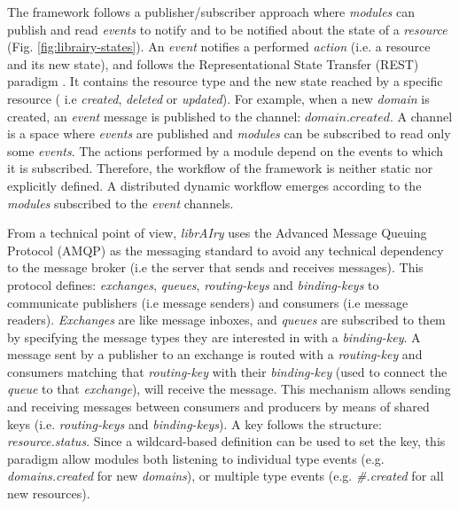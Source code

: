 

The framework follows a publisher/subscriber approach where \textit{modules} can publish and read \textit{events} to notify and to be notified about the state of a \textit{resource} (Fig. \ref{fig:librairy-states}). An \textit{event} notifies a performed \textit{action} (i.e. a resource and its new state), and follows the Representational State Transfer (REST) paradigm \citep{Fielding2002}. It contains the resource type and the new state reached by a specific resource ( i.e \textit{created}, \textit{deleted} or \textit{updated}). For example, when a new \textit{domain} is created, an \textit{event} message is published to the channel: $domain.created$. A channel is a space where \textit{events} are published and \textit{modules} can be subscribed to read only some \textit{events}. The actions performed by a module depend on the events to which it is subscribed. Therefore, the workflow of the framework is neither static nor explicitly defined. A distributed dynamic workflow emerges according to the \textit{modules} subscribed to the \textit{event} channels.

From a technical point of view, \textit{librAIry} uses the Advanced Message Queuing Protocol (AMQP) as the messaging standard to avoid any technical dependency to the message broker (i.e the server that sends and receives messages). This protocol defines: \textit{exchanges}, \textit{queues}, \textit{routing-keys} and \textit{binding-keys} to communicate publishers (i.e message senders) and consumers (i.e message readers). \textit{Exchanges} are like message inboxes, and \textit{queues} are subscribed to them by specifying the message types they are interested in with a \textit{binding-key}. A message sent by a publisher to an exchange is routed with a \textit{routing-key} and consumers matching that \textit{routing-key} with their \textit{binding-key} (used to connect the \textit{queue} to that \textit{exchange}), will receive the message. This mechanism allows sending and receiving messages between consumers and producers by means of shared keys (i.e. \textit{routing-keys} and \textit{binding-keys}). A key follows the structure: \textit{resource.status}. Since a wildcard-based definition can be used to set the key, this paradigm allow modules both listening to individual type events (e.g. \textit{domains.created} for new \textit{domains}), or multiple type events (e.g. \textit{\#.created} for all new resources).


